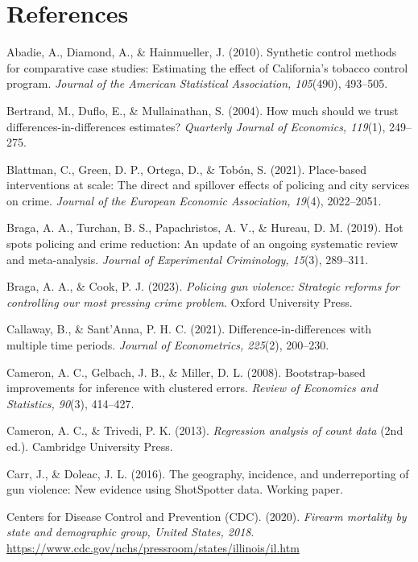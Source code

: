 \documentclass[12pt]{article}
\begin{document}
\section*{References}
\begin{flushleft}
\setlength{\parindent}{-0.5in}
\leftskip=0.5in

Abadie, A., Diamond, A., \& Hainmueller, J. (2010). Synthetic control methods for
comparative case studies: Estimating the effect of California's tobacco control program.
\emph{Journal of the American Statistical Association, 105}(490), 493--505.

Bertrand, M., Duflo, E., \& Mullainathan, S. (2004). How much should we trust
differences-in-differences estimates? \emph{Quarterly Journal of Economics, 119}(1),
249--275.

Blattman, C., Green, D. P., Ortega, D., \& Tob\'{o}n, S. (2021). Place-based interventions
at scale: The direct and spillover effects of policing and city services on crime.
\emph{Journal of the European Economic Association, 19}(4), 2022--2051.

Braga, A. A., Turchan, B. S., Papachristos, A. V., \& Hureau, D. M. (2019). Hot spots
policing and crime reduction: An update of an ongoing systematic review and meta-analysis.
\emph{Journal of Experimental Criminology, 15}(3), 289--311.

Braga, A. A., \& Cook, P. J. (2023). \emph{Policing gun violence: Strategic reforms for
controlling our most pressing crime problem}. Oxford University Press.

Callaway, B., \& Sant'Anna, P. H. C. (2021). Difference-in-differences with multiple time
periods. \emph{Journal of Econometrics, 225}(2), 200--230.

Cameron, A. C., Gelbach, J. B., \& Miller, D. L. (2008). Bootstrap-based improvements for
inference with clustered errors. \emph{Review of Economics and Statistics, 90}(3),
414--427.

Cameron, A. C., \& Trivedi, P. K. (2013). \emph{Regression analysis of count data} (2nd
ed.). Cambridge University Press.

Carr, J., \& Doleac, J. L. (2016). The geography, incidence, and underreporting of gun
violence: New evidence using ShotSpotter data. Working paper.

Centers for Disease Control and Prevention (CDC). (2020). \emph{Firearm mortality by
state and
demographic group, United States, 2018}.
\url{https://www.cdc.gov/nchs/pressroom/states/illinois/il.htm}


\end{flushleft}
\end{document}
